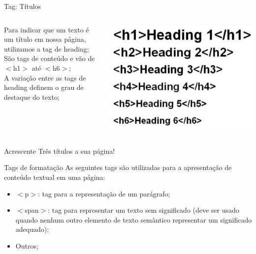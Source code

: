 \documentclass{beamer}
\begin{document}
\begin{frame}{Tag: Títulos}
  \begin{columns}
    \begin{column}{0.5\textwidth}
      Para indicar que um texto é um título em nossa página,
utilizamos a tag de heading;\\

      São tags de conteúdo e vão de $<$h1$>$ até $<$h6$>$;\\
 
    A variação entre as tags de heading definem o grau de destaque do texto;
   \end{column}
   \begin{column}{0.4\textwidth}
    \begin{center}
      \includegraphics[height=0.4\paperheight]{fig/aula1/heading.png} \\
    \end{center}
   \end{column}
  \end{columns}
  
  Acrescente Três títulos a sua página!
\end{frame}
\begin{frame}{Tags de formatação}
 As seguintes tags são utilizadas para a apresentação de conteúdo textual em 
uma 
página:
\begin{itemize}
 \item $<$p$>$: tag para a representação de um parágrafo;
  \item $<$span$>$: tag para representar um texto sem significado (deve 
ser usado quando nenhum outro elemento de texto semântico representar um 
significado adequado);
   \item Outros;
\end{itemize}
\end{frame}
\end{document}
